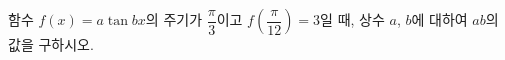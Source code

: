 함수 $f(x)=a\tan bx$의 주기가 $\dfrac{\pi}{3}$이고 $f\!\left(\dfrac{\pi}{12}\right)=3$일 때, 상수 $a$, $b$에 대하여 $ab$의 값을 구하시오. 
